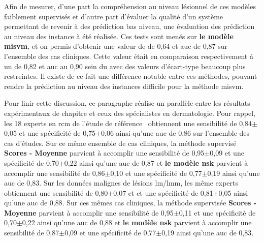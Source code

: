 Afin de mesurer, d'une part la compréhension au niveau lésionnel de ces modèles faiblement supervisés et d'autre part d'évaluer la qualité d'un système permettant de revenir à des prédiction bas niveau, une évaluation des prédiction au niveau des instance à été réalisée. Ces tests sont menés sur \textbf{le modèle \gls{misvm}}, et on permis d'obtenir une valeur de \fscore{} de 0,64 et \gls{auc} de 0,87 sur l'ensemble des cas cliniques. Cette valeur était en comparaison respectivement à un \fscore{} de 0,82 et \gls{auc} au 0,90 sein du  avec des valeurs d'écart-type beaucoup plus restreintes. Il existe de ce fait une différence notable entre ces méthodes, pouvant rendre la prédiction au niveau des instances difficile pour la méthode \gls{misvm}.\par

Pour finir cette discussion, ce paragraphe réalise un parallèle entre les résultats expérimentaux de chapitre et ceux des spécialistes en dermatologie. Pour rappel, les 18 experts en \gls{rcm} de l’étude de référence~\cite{Cinotti2016} obtiennent une sensibilité de 0,84$\pm$0,05 et une spécificité de 0,75$\pm$0,06 ainsi qu'une \gls{auc} de 0,86 sur l'ensemble des cas d'études. Sur ce même ensemble de cas cliniques, la méthode supervisé \textbf{Scores - Moyenne} parvient à accomplir une sensibilité de 0,95$\pm$0,09 et une spécificité de 0,70$\pm$0,22 ainsi qu'une \gls{auc} de 0,87 et \textbf{le modèle \gls{nsk}} parvient à accomplir une sensibilité de 0,86$\pm$0,10 et une spécificité de 0,77$\pm$0,19 ainsi qu'une \gls{auc} de 0,83. Sur les données malignes de lésions \gls{lm}/\gls{lmm}, les même experts obtiennent une sensibilité de 0,80$\pm$0,07 et et une spécificité de 0,81$\pm$0,05 ainsi qu'une \gls{auc} de 0,88. Sur ces mêmes cas cliniques, la méthode supervisée \textbf{Scores - Moyenne} parvient à accomplir une sensibilité de 0,95$\pm$0,11 et une spécificité de 0,70$\pm$0,22 ainsi qu'une \gls{auc} de 0,88 et \textbf{le modèle \gls{nsk}} parvient à accomplir une sensibilité de 0,87$\pm$0,09 et une spécificité de 0,77$\pm$0,19 ainsi qu'une \gls{auc} de 0,83.\par